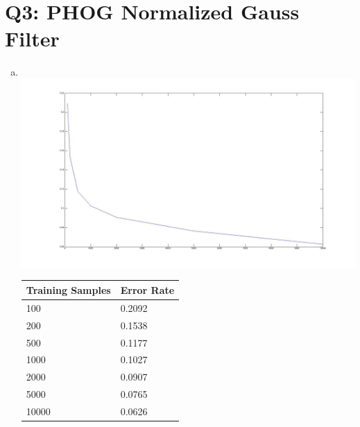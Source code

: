 \documentclass[12pt]{article}
\begin{document}
\section*{Q3: PHOG Normalized Gauss Filter}
  \begin{enumerate}[d.]
    \item \quad \\
      \includegraphics[scale=0.3]{q3_normalized_gauss.jpg}
      \begin{tabular}{l|l}
        \hline
        Training Samples & Error Rate \\
        \hline
        100   & 0.2092 \\
        200   & 0.1538 \\
        500   & 0.1177 \\
        1000  & 0.1027 \\
        2000  & 0.0907 \\
        5000  & 0.0765 \\
        10000 & 0.0626 \\
      \end{tabular}
  \end{enumerate}
\end{document}
